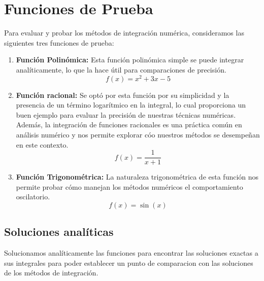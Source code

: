 \documentclass[a4paper]{article}
\begin{document}
    \section{Funciones de Prueba}
	\label{sec:funciones}
    Para evaluar y probar los métodos de integración numérica, consideramos las siguientes tres 	
    funciones de prueba:

    \begin{enumerate}
    
      \item \textbf{Función Polinómica:}
       Esta función polinómica simple se puede integrar analíticamente, lo que la hace útil para 
       comparaciones de precisión.
      \begin{equation}
      f(x) = x^2 + 3x - 5
      \end{equation}
    
      \item \textbf{Función racional:}
       Se optó por esta función por su simplicidad y la presencia de un término logarítmico en la 	
       integral, lo cual proporciona un buen ejemplo para evaluar la precisión de nuestras técnicas 
       numéricas. Además, la integración de funciones racionales es una práctica común en análisis 
       numérico y nos permite explorar cóo nuestros métodos se desempeñan en este contexto.
      \begin{equation}
      f(x) = \frac{1}{x + 1}
      \end{equation}

       \item \textbf{Función Trigonométrica:}
       La naturaleza trigonométrica de esta función nos permite probar cómo manejan los métodos
       numéricos el comportamiento oscilatorio.
      \begin{equation}
      f(x) = \sin(x)
      \end{equation}
    
    \end{enumerate}

    \subsection{Soluciones analíticas}
    Solucionamos analíticamente las funciones para encontrar las soluciones exactas a sus integrales para poder establecer un punto de comparacion con las soluciones de los métodos de integración.
\end{document}
